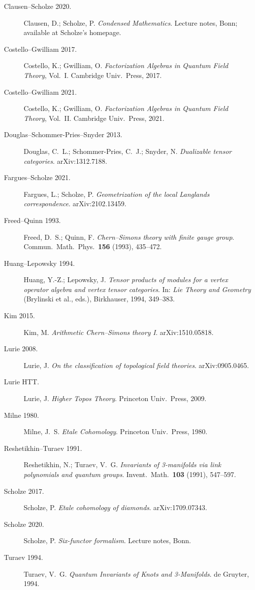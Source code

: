 \begin{description}
\item[Clausen--Scholze 2020.] Clausen, D.; Scholze, P. \emph{Condensed
Mathematics}. Lecture notes, Bonn; available at Scholze's homepage.
\item[Costello--Gwilliam 2017.] Costello, K.; Gwilliam, O.
\emph{Factorization Algebras in Quantum Field Theory}, Vol.~I.
Cambridge Univ.~Press, 2017.
\item[Costello--Gwilliam 2021.] Costello, K.; Gwilliam, O.
\emph{Factorization Algebras in Quantum Field Theory}, Vol.~II.
Cambridge Univ.~Press, 2021.
\item[Douglas--Schommer-Pries--Snyder 2013.] Douglas, C.~L.;
Schommer-Pries, C.~J.; Snyder, N. \emph{Dualizable tensor
categories}. arXiv:1312.7188.
\item[Fargues--Scholze 2021.] Fargues, L.; Scholze, P.
\emph{Geometrization of the local Langlands correspondence}.
arXiv:2102.13459.
\item[Freed--Quinn 1993.] Freed, D.~S.; Quinn, F. \emph{Chern--Simons
theory with finite gauge group}. Commun.~Math.~Phys.~\textbf{156}
(1993), 435--472.
\item[Huang--Lepowsky 1994.] Huang, Y.-Z.; Lepowsky, J.
\emph{Tensor products of modules for a vertex operator algebra and
vertex tensor categories}. In: \emph{Lie Theory and Geometry}
(Brylinski et al., eds.), Birkhauser, 1994, 349--383.
\item[Kim 2015.] Kim, M. \emph{Arithmetic Chern--Simons theory I}.
arXiv:1510.05818.
\item[Lurie 2008.] Lurie, J. \emph{On the classification of
topological field theories}. arXiv:0905.0465.
\item[Lurie HTT.] Lurie, J. \emph{Higher Topos Theory}. Princeton
Univ.~Press, 2009.
\item[Milne 1980.] Milne, J.~S. \emph{Etale Cohomology}. Princeton
Univ.~Press, 1980.
\item[Reshetikhin--Turaev 1991.] Reshetikhin, N.; Turaev, V.~G.
\emph{Invariants of 3-manifolds via link polynomials and quantum
groups}. Invent.~Math.~\textbf{103} (1991), 547--597.
\item[Scholze 2017.] Scholze, P. \emph{Etale cohomology of diamonds}.
arXiv:1709.07343.
\item[Scholze 2020.] Scholze, P. \emph{Six-functor formalism}.
Lecture notes, Bonn.
\item[Turaev 1994.] Turaev, V.~G. \emph{Quantum Invariants of Knots
and 3-Manifolds}. de Gruyter, 1994.
\end{description}
